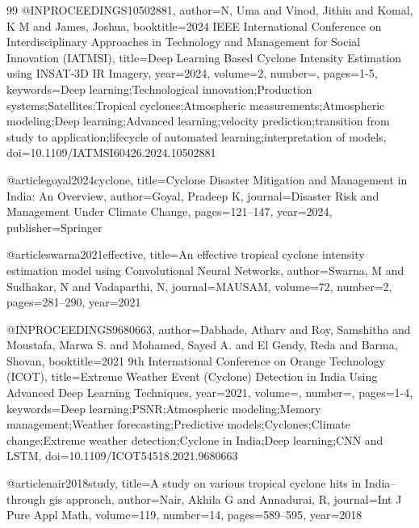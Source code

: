 \begin{thebibliography}{99}
@INPROCEEDINGS{10502881,
  author={N, Uma and Vinod, Jithin and Komal, K M and James, Joshua},
  booktitle={2024 IEEE International Conference on Interdisciplinary Approaches in Technology and Management for Social Innovation (IATMSI)}, 
  title={Deep Learning Based Cyclone Intensity Estimation using INSAT-3D IR Imagery}, 
  year={2024},
  volume={2},
  number={},
  pages={1-5},
  keywords={Deep learning;Technological innovation;Production systems;Satellites;Tropical cyclones;Atmospheric measurements;Atmospheric modeling;Deep learning;Advanced learning;velocity prediction;transition from study to application;lifecycle of automated learning;interpretation of models},
  doi={10.1109/IATMSI60426.2024.10502881}}


@article{goyal2024cyclone,
  title={Cyclone Disaster Mitigation and Management in India: An Overview},
  author={Goyal, Pradeep K},
  journal={Disaster Risk and Management Under Climate Change},
  pages={121--147},
  year={2024},
  publisher={Springer}
}

@article{swarna2021effective,
  title={An effective tropical cyclone intensity estimation model using Convolutional Neural Networks},
  author={Swarna, M and Sudhakar, N and Vadaparthi, N},
  journal={MAUSAM},
  volume={72},
  number={2},
  pages={281--290},
  year={2021}
}

@INPROCEEDINGS{9680663,
  author={Dabhade, Atharv and Roy, Samshitha and Moustafa, Marwa S. and Mohamed, Sayed A. and El Gendy, Reda and Barma, Shovan},
  booktitle={2021 9th International Conference on Orange Technology (ICOT)}, 
  title={Extreme Weather Event (Cyclone) Detection in India Using Advanced Deep Learning Techniques}, 
  year={2021},
  volume={},
  number={},
  pages={1-4},
  keywords={Deep learning;PSNR;Atmospheric modeling;Memory management;Weather forecasting;Predictive models;Cyclones;Climate change;Extreme weather detection;Cyclone in India;Deep learning;CNN and LSTM},
  doi={10.1109/ICOT54518.2021.9680663}}


@article{nair2018study,
  title={A study on various tropical cyclone hits in India--through gis approach},
  author={Nair, Akhila G and Annadurai, R},
  journal={Int J Pure Appl Math},
  volume={119},
  number={14},
  pages={589--595},
  year={2018}
}





\end{thebibliography}